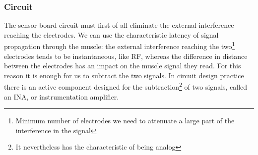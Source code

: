 \documentclass[a4paper, 10pt, final]{article} %
\begin{document}
    \subsubsection{Circuit} \label{sec:SensorBoardSchematic}
    The sensor board circuit must first of all eliminate the external interference reaching the electrodes.
    We can use the characteristic latency of signal propagation through the muscle: the external interference reaching the two\footnote{Minimum number of electrodes we need to attenuate a large part of the interference in the signal} electrodes tends to be instantaneous, like RF, whereas the difference in distance between the electrodes has an impact on the muscle signal they read.
    For this reason it is enough for us to subtract the two signals.
    In circuit design practice there is an active component designed for the subtraction\footnote{It nevertheless has the characteristic of being analog} of two signals, called an INA, or instrumentation amplifier.
\end{document}
